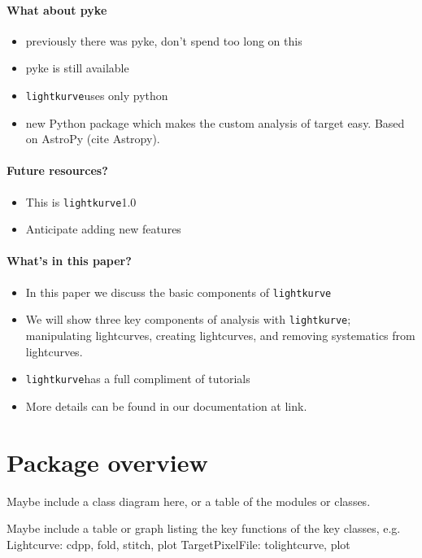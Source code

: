 \documentclass[twocolumn]{aastex62}
\newcommand{\lightkurve}{\texttt{lightkurve}}
\begin{document}
\paragraph{What about pyke}
\begin{itemize}
\item previously there was pyke, don't spend too long on this
\item pyke is still available
\item \lightkurve uses only python
\item  new Python package which makes the custom analysis of target easy.  Based on AstroPy (cite Astropy).
\end{itemize}

\paragraph{Future resources?}
\begin{itemize}
\item This is \lightkurve 1.0
\item Anticipate adding new features
\end{itemize}

\paragraph{What's in this paper?}
\begin{itemize}
\item In this paper we discuss the basic components of \lightkurve
\item We will show three key components of analysis with \lightkurve; manipulating lightcurves, creating lightcurves,
and removing systematics from lightcurves.
\item \lightkurve has a full compliment of tutorials
\item More details can be found in our documentation at link.
\end{itemize}



\section{Package overview}

Maybe include a class diagram here, or a table of the modules or classes.

Maybe include a table or graph listing the key functions of the key classes,
e.g.
Lightcurve: cdpp, fold, stitch, plot
TargetPixelFile: tolightcurve, plot
\end{document}
